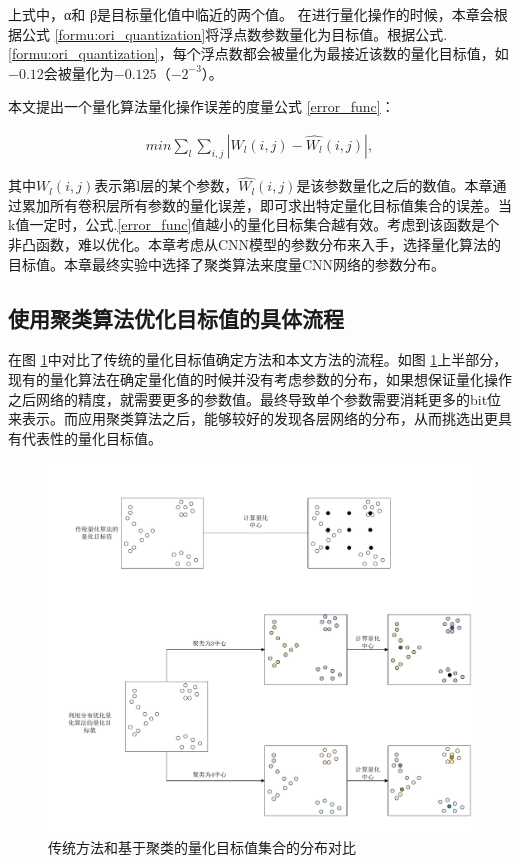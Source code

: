 \documentclass[ pdftex, oneside, master]{NJUthesis}
\begin{document}
上式中，α和 β是目标量化值中临近的两个值。 在进行量化操作的时候，本章会根据公式 \ref{formu:ori_quantization}将浮点数参数量化为目标值。根据公式.\ref{formu:ori_quantization}，每个浮点数都会被量化为最接近该数的量化目标值，如$-0.12$会被量化为$-0.125$（$-2^{-3}$）。

本文提出一个量化算法量化操作误差的度量公式 \ref{error_func}：

\begin{eqnarray}
min \sum_{l}\sum_{i,j}|W_l(i,j)-\hat{W_l}(i,j)|,
\label{error_func}
\end{eqnarray}

其中$W_l(i,j)$表示第l层的某个参数，$\hat{W_l}(i,j)$是该参数量化之后的数值。本章通过累加所有卷积层所有参数的量化误差，即可求出特定量化目标值集合的误差。当k值一定时，公式.\ref{error_func}值越小的量化目标集合越有效。考虑到该函数是个非凸函数，难以优化。本章考虑从CNN模型的参数分布来入手，选择量化算法的目标值。本章最终实验中选择了聚类算法来度量CNN网络的参数分布。

\subsection{使用聚类算法优化目标值的具体流程}\label{sec1.1}

在图 \ref{cluster_quantization}中对比了传统的量化目标值确定方法和本文方法的流程。如图 \ref{cluster_quantization}上半部分，现有的量化算法在确定量化值的时候并没有考虑参数的分布，如果想保证量化操作之后网络的精度，就需要更多的参数值。最终导致单个参数需要消耗更多的bit位来表示。而应用聚类算法之后，能够较好的发现各层网络的分布，从而挑选出更具有代表性的量化目标值。

\begin{figure}[h]
	\centering
	\includegraphics[width=0.7\linewidth]{cluster_quantization.pdf}  %
	\caption{传统方法和基于聚类的量化目标值集合的分布对比}  %
	\label{cluster_quantization}   %
\end{figure}
\end{document}
